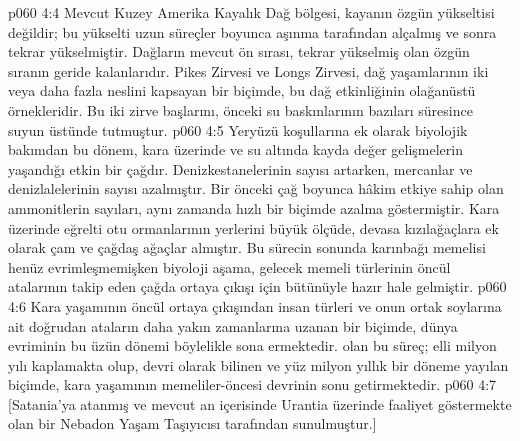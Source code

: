 \vs p060 4:4 Mevcut Kuzey Amerika Kayalık Dağ bölgesi, kayanın özgün yükseltisi değildir; bu yükselti uzun süreçler boyunca aşınma tarafından alçalmış ve sonra tekrar yükselmiştir. Dağların mevcut ön sırası, tekrar yükselmiş olan özgün sıranın geride kalanlarıdır. Pikes Zirvesi ve Longs Zirvesi, dağ yaşamlarının iki veya daha fazla neslini kapsayan bir biçimde, bu dağ etkinliğinin olağanüstü örnekleridir. Bu iki zirve başlarını, önceki su baskınlarının bazıları süresince suyun üstünde tutmuştur.
\vs p060 4:5 Yeryüzü koşullarına ek olarak biyolojik bakımdan bu dönem, kara üzerinde ve su altında kayda değer gelişmelerin yaşandığı etkin bir çağdır. Denizkestanelerinin sayısı artarken, mercanlar ve denizlalelerinin sayısı azalmıştır. Bir önceki çağ boyunca hâkim etkiye sahip olan ammonitlerin sayıları, aynı zamanda hızlı bir biçimde azalma göstermiştir. Kara üzerinde eğrelti otu ormanlarının yerlerini büyük ölçüde, devasa kızılağaçlara ek olarak çam ve çağdaş ağaçlar almıştır. Bu sürecin sonunda karınbağı memelisi henüz evrimleşmemişken biyoloji aşama, gelecek memeli türlerinin öncül atalarının takip eden çağda ortaya çıkışı için bütünüyle hazır hale gelmiştir.
\vs p060 4:6 Kara yaşamının öncül ortaya çıkışından insan türleri ve onun ortak soylarına ait doğrudan ataların daha yakın zamanlarına uzanan bir biçimde, dünya evriminin bu üzün dönemi böylelikle sona ermektedir.  olan bu süreç; elli milyon yılı kaplamakta olup,  devri olarak bilinen ve yüz milyon yıllık bir döneme yayılan biçimde, kara yaşamının memeliler\hyp{}öncesi devrinin sonu getirmektedir.
\vs p060 4:7 [Satania’ya atanmış ve mevcut an içerisinde Urantia üzerinde faaliyet göstermekte olan bir Nebadon Yaşam Taşıyıcısı tarafından sunulmuştur.]
